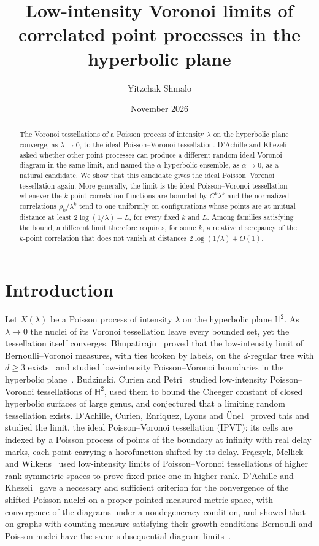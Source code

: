 \documentclass[11pt]{amsart}
\title[Low-intensity Voronoi limits of correlated point processes]{Low-intensity Voronoi limits of correlated point
processes in the hyperbolic plane}
\author{Yitzchak Shmalo}
\date{November 2026}
\theoremstyle{definition}
\theoremstyle{remark}
\newcommand{\HH}{\mathbb{H}}
\begin{document}
\begin{abstract}
The Voronoi tessellations of a Poisson process of intensity $\lambda$ on the hyperbolic plane converge, as
$\lambda\to0$, to the ideal Poisson--Voronoi tessellation. D'Achille and Khezeli asked whether other point processes
can produce a different random ideal Voronoi diagram in the same limit, and named the $\alpha$-hyperbolic ensemble, as
$\alpha\to0$, as a natural candidate. We show that this candidate gives the ideal Poisson--Voronoi tessellation again.
More generally, the limit is the ideal Poisson--Voronoi tessellation whenever the $k$-point correlation functions are
bounded by $C^k\lambda^k$ and the normalized correlations $\rho_k/\lambda^k$ tend to one uniformly on configurations whose points are at mutual
distance at least $2\log(1/\lambda)-L$, for every fixed $k$ and $L$. Among families satisfying the bound, a different limit
therefore requires, for some $k$, a relative discrepancy of the $k$-point correlation that does not vanish at distances
$2\log(1/\lambda)+O(1)$.
\end{abstract}
\maketitle

\section{Introduction}

Let $X(\lambda)$ be a Poisson process of intensity $\lambda$ on the hyperbolic plane $\HH^2$. As $\lambda\to0$ the
nuclei of its Voronoi tessellation leave every bounded set, yet the tessellation itself converges. Bhupatiraju~\cite{Bhu19}
proved that the low-intensity limit of Bernoulli--Voronoi measures, with ties broken by labels, on the $d$-regular tree
with $d\ge3$ exists~\cite[Theorem~2.1]{Bhu19}
and studied low-intensity Poisson--Voronoi boundaries in the hyperbolic plane~\cite[Chapter~3]{Bhu19}. Budzinski, Curien
and Petri~\cite{BCP25} studied low-intensity Poisson--Voronoi tessellations of $\HH^2$, used them to bound the
Cheeger constant of closed hyperbolic surfaces of large genus, and conjectured that a limiting random tessellation
exists. D'Achille, Curien, Enriquez, Lyons and \"Unel~\cite{DCE26} proved this and studied the limit, the ideal
Poisson--Voronoi tessellation (IPVT): its cells are indexed by a Poisson process of points of the boundary at
infinity with real delay marks, each point carrying a horofunction shifted by its delay. Fr\k{a}czyk, Mellick and
Wilkens~\cite{FMW23} used low-intensity limits of Poisson--Voronoi tessellations of higher rank symmetric spaces to
prove fixed price one in higher rank. D'Achille and Khezeli~\cite{DK26} gave a necessary and sufficient criterion for
the convergence of the shifted Poisson nuclei on a proper pointed measured metric space, with convergence of the
diagrams under a nondegeneracy condition, and showed that on graphs with counting measure satisfying their growth
conditions Bernoulli and
Poisson nuclei have the same subsequential diagram limits~\cite[Lemma~4.9]{DK26}.
\end{document}
